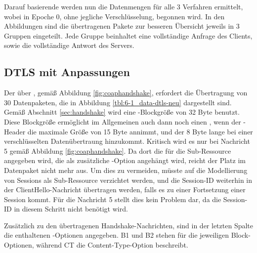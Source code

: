 Darauf basierende werden nun die Datenmengen für alle 3 Verfahren ermittelt, wobei in Epoche 0, ohne jegliche Verschlüsselung, begonnen wird.
In den Abbildungen sind die übertragenen Pakete zur besseren Übersicht jeweils in 3 Gruppen eingeteilt. Jede Gruppe beinhaltet eine vollständige
Anfrage des Clients, sowie die vollständige Antwort des Servers.

\subsection{DTLS mit Anpassungen}
\label{sec:new-dtls}

Der  über , gemäß Abbildung \ref{fig:coaphandshake}, erfordert die Übertragung von 30 Datenpaketen, die in Abbildung
\ref{tbl:6-1_data-dtls-neu} dargestellt sind. Gemäß Abschnitt \ref{sec:handshake} wird eine -Blockgröße von 32 Byte benutzt. Diese
Blockgröße ermöglicht im Allgemeinen auch dann noch einen , wenn der -Header die maximale Größe von 15 Byte annimmt, und der 8 Byte
lange  bei einer verschlüsselten Datenübertraung hinzukommt. Kritisch wird es nur bei Nachricht 5 gemäß Abbildung \ref{fig:coaphandshake}.
Da dort die  für die Sub-Ressource angegeben wird, die als zusätzliche -Option angehängt wird, reicht der Platz im Datenpaket
nicht mehr aus. Um dies zu vermeiden, müsste auf die Modellierung von Sessions als Sub-Ressource verzichtet werden, und die Session-ID weiterhin
in der ClientHello-Nachricht übertragen werden, falls es zu einer Fortsetzung einer Session kommt. Für die Nachricht 5 stellt dies kein Problem dar,
da die Session-ID in diesem Schritt nicht benötigt wird.

Zusätzlich zu den übertragenen Handshake-Nachrichten, sind in der letzten Spalte die enthaltenen -Optionen angegeben. B1 und B2 stehen
für die jeweiligen Block-Optionen, während CT die Content-Type-Option beschreibt.

